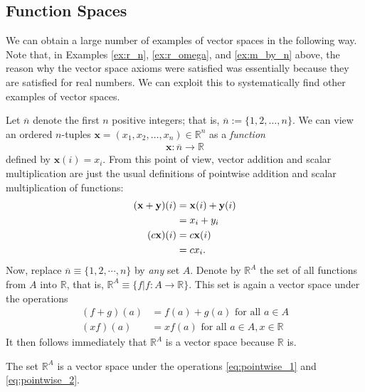 \documentclass[12pt,letterpaper,reqno]{article}
\numberwithin{equation}{section}
\begin{document}
\subsection{Function Spaces}
We can obtain a large number of examples of vector spaces in the following way. Note that, in Examples \ref{ex:r_n}, \ref{ex:r_omega}, and \ref{ex:m_by_n} above, the reason why the vector space axioms were satisfied was essentially because they are satisfied for real numbers. We can exploit this to systematically find other examples of vector spaces.

Let $\overline{n}$ denote the first $n$ positive integers; that is, $\overline{n}:=\{1,2,\dots,n\}$. We can view an ordered $n$-tuples $\mathbf{x}=(x_1,x_2,\dots,x_n) \in \mathbb{R}^n$ as a \emph{function} 
\begin{align*}
	\mathbf{x}:\overline{n} \to \mathbb{R}
\end{align*}
defined by $\mathbf{x}(i)=x_i$. From this point of view, vector addition and scalar multiplication are just the usual definitions of pointwise addition and scalar multiplication of functions:
\begin{align*}
	({\bf x}+{\bf y})(i)&={\bf x}(i)+{\bf y}(i) \\
	&=x_i+y_i \\
	(c{\bf x})(i)&=c{\bf x}(i) \\
	&=cx_i.
\end{align*}
Now, replace $\overline{n}\equiv \{1,2,\cdots,n\}$ by \emph{any} set $A$.
	Denote by $\mathbb{R}^A$ the set of all functions from $A$ into $\mathbb{R}$, that is, $\mathbb{R}^A\equiv \{f|f:A \to \mathbb{R}\}$. This set is again a vector space under the operations
 \begin{align}\label{eq:pointwise_1}
	(f+g)(a)&=f(a)+g(a) \text{ for all } a \in A\\ \label{eq:pointwise_2}
	(xf)(a)&=xf(a) \text{ for all } a \in A, x \in \mathbb{R} 
\end{align}
It then follows immediately that $\mathbb{R}^A$ is a vector space because $\mathbb{R}$ is.

\begin{prop}
The set $\mathbb{R}^A$ is a vector space under the operations \eqref{eq:pointwise_1} and \eqref{eq:pointwise_2}.
\end{prop}
\end{document}
